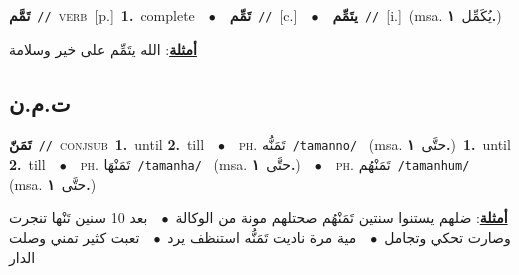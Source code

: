 \documentclass[10pt,a4paper,twoside]{article} %
\begin{document}
\begin{multicols}{2}
{\setlength\topsep{0pt}\textbf{\foreignlanguage{arabic}{تَمَّم}}\ {\color{gray}\texttt{//}\color{black}}\ \textsc{verb}\ [p.]\ \textbf{1.}~complete\ \ $\bullet$\ \ \setlength\topsep{0pt}\textbf{\foreignlanguage{arabic}{تَمِّم}}\ {\color{gray}\texttt{//}\color{black}}\ [c.]\ \ $\bullet$\ \ \setlength\topsep{0pt}\textbf{\foreignlanguage{arabic}{يتَمِّم}}\ {\color{gray}\texttt{//}\color{black}}\ [i.]\ \color{gray}(msa. \foreignlanguage{arabic}{يُكَمِّل}~\foreignlanguage{arabic}{\textbf{١.}})\color{black}\  \begin{flushright}\color{gray}\foreignlanguage{arabic}{\textbf{\underline{\foreignlanguage{arabic}{أمثلة}}}: الله يتَمِّم على خير وسلامة}\end{flushright}\color{black}} \vspace{2mm}

\vspace{-3mm}
\subsection*{\color{blue}\foreignlanguage{arabic}{ت.م.ن}\color{blue}{}} 

{\setlength\topsep{0pt}\textbf{\foreignlanguage{arabic}{تَمَنّ}}\ {\color{gray}\texttt{//}\color{black}}\ \textsc{conj\textunderscore sub}\ \textbf{1.}~until  \textbf{2.}~till\ \ $\bullet$\ \ \textsc{ph.} \color{gray} \foreignlanguage{arabic}{تَمَنُّه}\color{black}\ {\color{gray}\texttt{/{\sffamily tamanno}/}\color{black}}\ \color{gray} (msa. \foreignlanguage{arabic}{حتَّى}~\foreignlanguage{arabic}{\textbf{١.}})\color{black}\ \textbf{1.}~until  \textbf{2.}~till\ \ $\bullet$\ \ \textsc{ph.} \color{gray} \foreignlanguage{arabic}{تَمَنْهَا}\color{black}\ {\color{gray}\texttt{/{\sffamily tamanha}/}\color{black}}\ \color{gray} (msa. \foreignlanguage{arabic}{حتَّى}~\foreignlanguage{arabic}{\textbf{١.}})\color{black}\ \ $\bullet$\ \ \textsc{ph.} \color{gray} \foreignlanguage{arabic}{تَمَنْهُم}\color{black}\ {\color{gray}\texttt{/{\sffamily tamanhum}/}\color{black}}\ \color{gray} (msa. \foreignlanguage{arabic}{حتَّى}~\foreignlanguage{arabic}{\textbf{١.}})\color{black}\  \begin{flushright}\color{gray}\foreignlanguage{arabic}{\textbf{\underline{\foreignlanguage{arabic}{أمثلة}}}: ضلهم يستنوا سنتين تَمَنْهُم صحتلهم مونة من الوكالة\ $\bullet$\ \  بعد 10 سنين تَنْها تنجرت وصارت تحكي وتجامل\ $\bullet$\ \  مية مرة ناديت تَمَنُّه استنظف يرد\ $\bullet$\ \  تعبت كثير تمني وصلت الدار}\end{flushright}\color{black}} \vspace{2mm}


\end{multicols}
\end{document}
